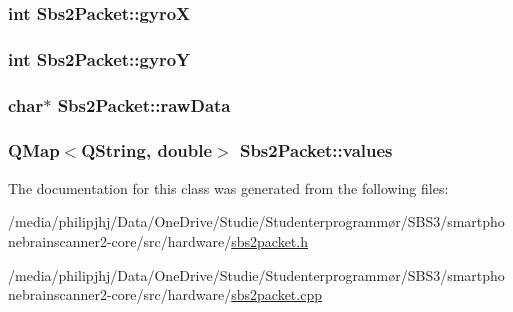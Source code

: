 \hypertarget{classSbs2Packet_a2a086b322eba8c8d7754316eebefb0d1}{
\subsubsection[{gyro\-X}]{\setlength{\rightskip}{0pt plus 5cm}int Sbs2\-Packet\-::gyro\-X}}\label{classSbs2Packet_a2a086b322eba8c8d7754316eebefb0d1}
\hypertarget{classSbs2Packet_aff1fc6891bbc36618c7e6434fe41e9bb}{
\subsubsection[{gyro\-Y}]{\setlength{\rightskip}{0pt plus 5cm}int Sbs2\-Packet\-::gyro\-Y}}\label{classSbs2Packet_aff1fc6891bbc36618c7e6434fe41e9bb}
\hypertarget{classSbs2Packet_a9f8b30bbf48424b92e9ec0491dd04843}{
\subsubsection[{raw\-Data}]{\setlength{\rightskip}{0pt plus 5cm}char$\ast$ Sbs2\-Packet\-::raw\-Data}}\label{classSbs2Packet_a9f8b30bbf48424b92e9ec0491dd04843}
\hypertarget{classSbs2Packet_a48d32912f9a418d6073867760c74c345}{
\subsubsection[{values}]{\setlength{\rightskip}{0pt plus 5cm}Q\-Map$<$Q\-String, double$>$ Sbs2\-Packet\-::values}}\label{classSbs2Packet_a48d32912f9a418d6073867760c74c345}


The documentation for this class was generated from the following files\-:\begin{DoxyCompactItemize}
\item 
/media/philipjhj/\-Data/\-One\-Drive/\-Studie/\-Studenterprogrammør/\-S\-B\-S3/smartphonebrainscanner2-\/core/src/hardware/\hyperlink{sbs2packet_8h}{sbs2packet.\-h}\item 
/media/philipjhj/\-Data/\-One\-Drive/\-Studie/\-Studenterprogrammør/\-S\-B\-S3/smartphonebrainscanner2-\/core/src/hardware/\hyperlink{sbs2packet_8cpp}{sbs2packet.\-cpp}\end{DoxyCompactItemize}
